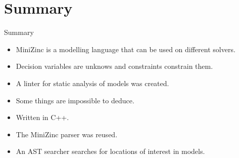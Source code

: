 \documentclass[aspectratio=169]{beamer} %
\begin{document}

\section{Summary}
\begin{frame}{Summary}
  \begin{itemize}
    \item MiniZinc is a modelling language that can be used on different solvers.
    \item Decision variables are unknows and constraints constrain them.
    \item A linter for static analysis of models was created.
    \item Some things are impossible to deduce.
    \item Written in C++.
    \item The MiniZinc parser was reused.
    \item An AST searcher searches for locations of interest in models.
  \end{itemize}
\end{frame}
\end{document}
